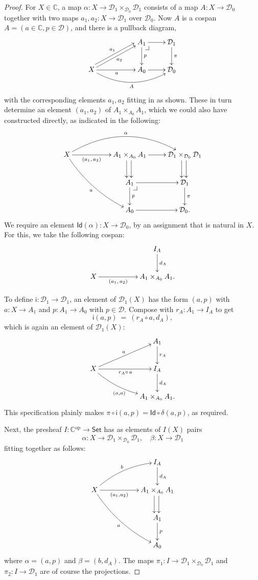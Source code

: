 \documentclass[12pt]{article}
\makeatletter
\newcommand{\C}{\ensuremath{\mathbb{C}}}
\newcommand{\D}{\ensuremath{\mathcal{D}}}
\newcommand{\Set}{\ensuremath{\mathsf{Set}}}
\newcommand{\op}{\ensuremath{^\mathrm{op}}}
\newcommand{\pbcorner}[1][dr]{\save*!/#1-1.2pc/#1:(-1,1)@^{|-}\restore}
\newcommand{\Id}{\mathsf{Id}}
\newcommand{\iy}{\mathsf{i}}
\theoremstyle{definition}
\makeatother
\begin{document}
\begin{proof}
For $X\in\C$, a map $\alpha: X\to  \D_1\times_{\D_0} \D_1$ consists of a map $A : X \to {\D_0}$ together with two maps $a_1,a_2 : X\to \D_1$ over ${\D_0}$.  Now $A$ is a cospan $A = (a\in \C,p\in\D)$, and there is a  pullback diagram,
\[
\xymatrix{
&& A_1 \ar[d]^{p} \ar[r] \pbcorner & \D_1 \ar[d]^{\pi}\\
X  \ar@<1ex>[urr]^{a_1} \ar[urr]_{a_2}  \ar[rr]_{a} \ar@/_4ex /[rrr]_{A} && A_0 \ar[r] & \D_0}
\]
%
with the corresponding elements $a_1, a_2$ fitting in as shown.  These in turn determine an element $(a_1,a_2)$ of $A_1\times_{A_0} A_1$, which we could also have constructed directly, as indicated in the following:
\[
\xymatrix{
X  \ar@/^6ex /[rrr]^{\alpha} \ar[rr]_-{(a_1,\, a_2)} \ar@/_2ex/[rrdd]_{a} && \ar@<-1ex>[d] \ar@<.5ex>[d]  A_1\times_{A_0} A_1 \ar[r] & \ar@<-1ex>[d] \ar@<.5ex>[d]  \D_1\times_{\D_0} \D_1\\
&& A_1 \ar[d]^{p} \ar[r] \pbcorner & \D_1 \ar[d]^{\pi} \\
&& A_0 \ar[r] & \D_0 .}
\]
We require an element $\Id(\alpha) : X\to \D_0$, by an assignment that is natural in $X$.  For this, we take the following cospan:
\[
\xymatrix{
&& I_A \ar[d]^{d_A}\\
X  \ar[rr]_-{(a_1,\, a_2)} && A_1\times_{A_0} A_1 .}
\]

%



To define $\iy : \D_1\to \D_1$, an element of $\D_1(X)$ has the form $(a,p)$ with $a: X \to A_1$ and $p: A_1\to A_0$ with $p\in\D$.  Compose with $r_A : A_1 \to I_A$ to get 
\[
\iy(a,p)\ =\ (r_A\circ a, d_A),
\]
which is again an element of $\D_1(X)$:
\begin{equation}\label{diag:rho}
\xymatrix{
&& A_1 \ar[d]^{r_A} \\
X  \ar[rru]^{a} \ar[rr]_{r_A\circ\,a} \ar@/_2ex/[rrd]_{(a,a)} && I_A \ar[d]^{d_A}\\
&& A_1\times_{A_0} A_1.}
\end{equation}
This specification plainly makes $\pi\circ\iy(a,p)=\Id\circ\delta(a,p)$, as required.

Next, the presheaf $I:\C\op\to \Set$ has as elements of $I(X)$ pairs $$\alpha: X\to  \D_1\times_{\D_0} \D_1,\quad \beta : X\to \D_1$$ fitting together as follows:
\[
\xymatrix{
&& I_A \ar[d]^{d_A}\\
X \ar@/^2ex /[urr]^{b} \ar[rr]_-{(a_1,a_2)} \ar@/_2ex /[rrdd]_{a} && \ar@<-1ex>[d] \ar@<.5ex>[d]  A_1\times_{A_0} A_1\\
&& A_1 \ar[d]^{p}\\
&& A_0 }
\]
where $\alpha = (a,p)$ and $\beta=(b,d_A)$. 
The maps $\pi_1: I\to  \D_1\times_{\D_0} \D_1$ and $\pi_2:I\to \D_1$ are of course the projections.


\end{proof}
\end{document}
